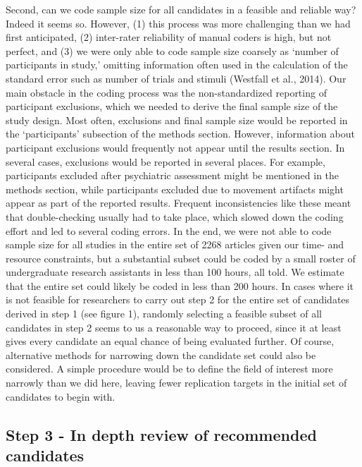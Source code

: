 \documentclass[
  english,
  man,floatsintext]{apa6}
\begin{document}
Second, can we code sample size for all candidates in a feasible and reliable way? Indeed it seems so. However, (1) this process was more challenging than we had first anticipated, (2) inter-rater reliability of manual coders is high, but not perfect, and (3) we were only able to code sample size coarsely as `number of participants in study,' omitting information often used in the calculation of the standard error such as number of trials and stimuli (Westfall et al., 2014). Our main obstacle in the coding process was the non-standardized reporting of participant exclusions, which we needed to derive the final sample size of the study design. Most often, exclusions and final sample size would be reported in the `participants' subsection of the methods section. However, information about participant exclusions would frequently not appear until the results section. In several cases, exclusions would be reported in several places. For example, participants excluded after psychiatric assessment might be mentioned in the methods section, while participants excluded due to movement artifacts might appear as part of the reported results. Frequent inconsistencies like these meant that double-checking usually had to take place, which slowed down the coding effort and led to several coding errors. In the end, we were not able to code sample size for all studies in the entire set of 2268 articles given our time- and resource constraints, but a substantial subset could be coded by a small roster of undergraduate research assistants in less than 100 hours, all told. We estimate that the entire set could likely be coded in less than 200 hours. In cases where it is not feasible for researchers to carry out step 2 for the entire set of candidates derived in step 1 (see figure 1), randomly selecting a feasible subset of all candidates in step 2 seems to us a reasonable way to proceed, since it at least gives every candidate an equal chance of being evaluated further. Of course, alternative methods for narrowing down the candidate set could also be considered. A simple procedure would be to define the field of interest more narrowly than we did here, leaving fewer replication targets in the initial set of candidates to begin with.

\hypertarget{step-3---in-depth-review-of-recommended-candidates}{%
\subsection{Step 3 - In depth review of recommended candidates}\label{step-3---in-depth-review-of-recommended-candidates}}
\end{document}
